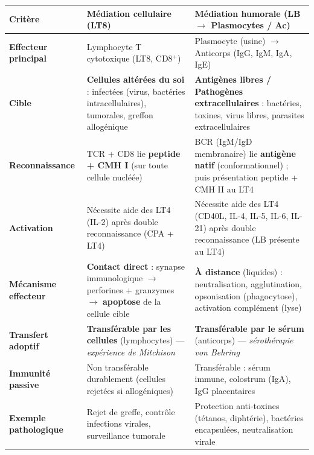 \documentclass[11pt]{article}
\begin{document}
\begin{center}
\begin{tabularx}{\linewidth}{|l|X|X|}
\hline
\rowcolor{popblueL}
\textbf{Critère} & \textbf{Médiation cellulaire (LT8)} & \textbf{Médiation humorale (LB $\to$ Plasmocytes / Ac)} \\
\hline
\textbf{Effecteur principal} & Lymphocyte T cytotoxique (LT8, CD8$^+$) & Plasmocyte (usine) $\to$ Anticorps (IgG, IgM, IgA, IgE) \\
\hline
\textbf{Cible} & \textbf{Cellules altérées du soi} : infectées (virus, bactéries intracellulaires), tumorales, greffon allogénique & \textbf{Antigènes libres / Pathogènes extracellulaires} : bactéries, toxines, virus libres, parasites extracellulaires \\
\hline
\textbf{Reconnaissance} & TCR + CD8 lie \textbf{peptide + CMH I} (sur toute cellule nucléée) & BCR (IgM/IgD membranaire) lie \textbf{antigène natif} (conformationnel) ; puis présentation peptide + CMH II au LT4 \\
\hline
\textbf{Activation} & Nécessite aide des LT4 (IL-2) après double reconnaissance (CPA + LT4) & Nécessite aide des LT4 (CD40L, IL-4, IL-5, IL-6, IL-21) après double reconnaissance (LB présente au LT4) \\
\hline
\textbf{Mécanisme effecteur} & \textbf{Contact direct} : synapse immunologique $\to$ perforines + granzymes $\to$ \textbf{apoptose} de la cellule cible & \textbf{À distance} (liquides) : neutralisation, agglutination, opsonisation (phagocytose), activation complément (lyse) \\
\hline
\textbf{Transfert adoptif} & \textbf{Transférable par les cellules} (lymphocytes) — \emph{expérience de Mitchison} & \textbf{Transférable par le sérum} (anticorps) — \emph{sérothérapie von Behring} \\
\hline
\textbf{Immunité passive} & Non transférable durablement (cellules rejetées si allogéniques) & Transférable : sérum immune, colostrum (IgA), IgG placentaires \\
\hline
\textbf{Exemple pathologique} & Rejet de greffe, contrôle infections virales, surveillance tumorale & Protection anti-toxines (tétanos, diphtérie), bactéries encapsulées, neutralisation virale \\
\hline
\end{tabularx}
\end{center}
\end{document}
